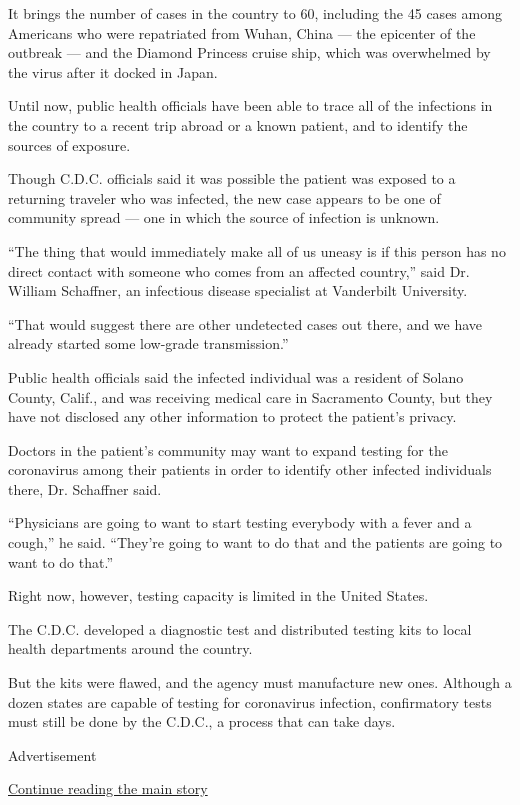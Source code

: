 It brings the number of cases in the country to 60, including the 45
cases among Americans who were repatriated from Wuhan, China --- the
epicenter of the outbreak --- and the Diamond Princess cruise ship,
which was overwhelmed by the virus after it docked in Japan.

Until now, public health officials have been able to trace all of the
infections in the country to a recent trip abroad or a known patient,
and to identify the sources of exposure.

Though C.D.C. officials said it was possible the patient was exposed to
a returning traveler who was infected, the new case appears to be one of
community spread --- one in which the source of infection is unknown.

``The thing that would immediately make all of us uneasy is if this
person has no direct contact with someone who comes from an affected
country,'' said Dr. William Schaffner, an infectious disease specialist
at Vanderbilt University.

``That would suggest there are other undetected cases out there, and we
have already started some low-grade transmission.''

Public health officials said the infected individual was a resident of
Solano County, Calif., and was receiving medical care in Sacramento
County, but they have not disclosed any other information to protect the
patient's privacy.

Doctors in the patient's community may want to expand testing for the
coronavirus among their patients in order to identify other infected
individuals there, Dr. Schaffner said.

``Physicians are going to want to start testing everybody with a fever
and a cough,'' he said. ``They're going to want to do that and the
patients are going to want to do that.''

Right now, however, testing capacity is limited in the United States.

The C.D.C. developed a diagnostic test and distributed testing kits to
local health departments around the country.

But the kits were flawed, and the agency must manufacture new ones.
Although a dozen states are capable of testing for coronavirus
infection, confirmatory tests must still be done by the C.D.C., a
process that can take days.

Advertisement

\protect\hyperlink{after-bottom}{Continue reading the main story}

